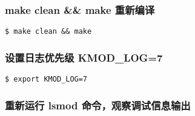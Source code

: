 \documentclass[11pt,a4paper]{article}
\begin{document}
\subsubsection{make clean \&\& make 重新编译}

{\begin{shaded}\begin{verbatim}
$ make clean && make
\end{verbatim}\end{shaded}}
\subsubsection{设置日志优先级 KMOD\_LOG=7}

{\begin{shaded}\begin{verbatim}
$ export KMOD_LOG=7
\end{verbatim}\end{shaded}}
\subsubsection{重新运行 lsmod 命令，观察调试信息输出}
\end{document}
